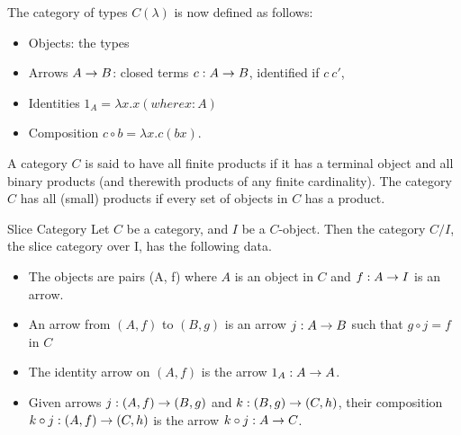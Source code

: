 \documentclass[../../notes.tex]{subfiles}
\begin{document}
The category of types $ C(\lambda ) $ is now defined as follows:
\begin{itemize}
\item Objects: the types
\item Arrows $A \rightarrow B$: closed terms $c: A \rightarrow B$, identified if $c ~ c'$,
\item Identities $1_A = \lambda x.x (where x : A) $
\item Composition $c \circ b = \lambda x.c(bx)$.
\end{itemize}

\begin{definition}
  A category $C$ is said to have all finite products if it has a terminal object
  and all binary products (and therewith products of any finite cardinality). The
  category $C$ has all (small) products if every set of objects in $C$ has a product.
\end{definition}

\begin{definition}{Slice Category}
  Let $C$ be a category, and $I$ be a $C$-object. Then the category $C / I$, the slice
  category over I, has the following data.
  \begin{itemize}
  \item The objects are pairs (A, f) where $A$ is an object in $C$ and $f: A \rightarrow I$ is
    an arrow.
  \item An arrow from $(A, f)$ to $(B, g)$ is an arrow $j: A \rightarrow B$ such that $g \circ j = f$ in $C$
  \item The identity arrow on $(A, f)$ is the arrow $1_A : A \rightarrow A$.
  \item Given arrows $j: (A, f) \rightarrow (B, g)$ and $ k: (B, g) \rightarrow (C, h) $, their composition
    $k \circ j: (A, f) \rightarrow (C, h)$ is the arrow $k \circ j : A \rightarrow C$.
  \end{itemize}
\end{definition}
\end{document}
